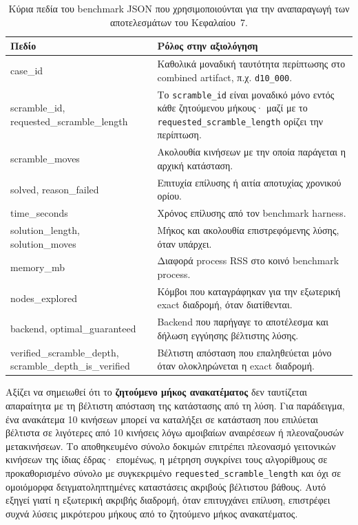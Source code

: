 \begin{table}[htbp]
\centering
\footnotesize
\caption{Κύρια πεδία του benchmark JSON που χρησιμοποιούνται για την αναπαραγωγή των αποτελεσμάτων του Κεφαλαίου~7.}
\label{tab:eval_json_schema}
\begin{tabularx}{\textwidth}{>{\ttfamily\RaggedRight\arraybackslash}p{4.0cm} Y}
\toprule
\normalfont\textbf{Πεδίο} & \textbf{Ρόλος στην αξιολόγηση} \\
\midrule
case\_id & Καθολικά μοναδική ταυτότητα περίπτωσης στο combined artifact, π.χ. \texttt{d10\_000}. \\
scramble\_id, requested\_scramble\_length & Το \texttt{scramble\_id} είναι μοναδικό μόνο εντός κάθε ζητούμενου μήκους· μαζί με το \texttt{requested\_scramble\_length} ορίζει την περίπτωση. \\
scramble\_moves & Ακολουθία κινήσεων με την οποία παράγεται η αρχική κατάσταση. \\
solved, reason\_failed & Επιτυχία επίλυσης ή αιτία αποτυχίας χρονικού ορίου. \\
time\_seconds & Χρόνος επίλυσης από τον benchmark harness. \\
solution\_length, solution\_moves & Μήκος και ακολουθία επιστρεφόμενης λύσης, όταν υπάρχει. \\
memory\_mb & Διαφορά process RSS στο κοινό benchmark process. \\
nodes\_explored & Κόμβοι που καταγράφηκαν για την εξωτερική exact διαδρομή, όταν διατίθενται. \\
backend, optimal\_guaranteed & Backend που παρήγαγε το αποτέλεσμα και δήλωση εγγύησης βέλτιστης λύσης. \\
verified\_scramble\_depth, scramble\_depth\_is\_verified & Βέλτιστη απόσταση που επαληθεύεται μόνο όταν ολοκληρώνεται η exact διαδρομή. \\
\bottomrule
\end{tabularx}
\end{table}

Αξίζει να σημειωθεί ότι το \textbf{ζητούμενο μήκος ανακατέματος} δεν ταυτίζεται απαραίτητα με τη βέλτιστη απόσταση της κατάστασης από τη λύση. Για παράδειγμα, ένα ανακάτεμα 10 κινήσεων μπορεί να καταλήξει σε κατάσταση που επιλύεται βέλτιστα σε λιγότερες από 10 κινήσεις λόγω αμοιβαίων αναιρέσεων ή πλεοναζουσών μετακινήσεων. Το αποθηκευμένο σύνολο δοκιμών επιτρέπει πλεονασμό γειτονικών κινήσεων της ίδιας έδρας· επομένως, η μέτρηση συγκρίνει τους αλγορίθμους σε προκαθορισμένο σύνολο με συγκεκριμένο \texttt{requested\_scramble\_length} και όχι σε ομοιόμορφα δειγματοληπτημένες καταστάσεις ακριβούς βέλτιστου βάθους. Αυτό εξηγεί γιατί η εξωτερική ακριβής διαδρομή, όταν επιτυγχάνει επίλυση, επιστρέφει συχνά λύσεις μικρότερου μήκους από το ζητούμενο μήκος ανακατέματος.

